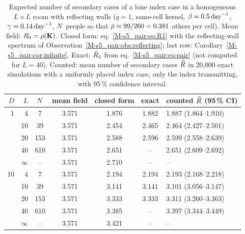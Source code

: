 \begin{table}[tbp]
\centering
\caption{Expected number of secondary cases of a lone index case in a homogeneous $L\times L$ room with
reflecting walls ($q=1$, same-cell kernel, $\beta=0.5\,\mathrm{day}^{-1}$, $\gamma=0.14\,\mathrm{day}^{-1}$, $N$ people so that
$\bar{\rho}\approx99/260=0.381$ others per cell). Mean field: $R_0=\rho(\mathbf{K})$. Closed form: eq.~\eqref{M-s5_pair:eq:R1} with the reflecting-wall
spectrum of Observation~\ref{M-s5_pair:obs:reflecting}; last row: Corollary~\ref{M-s5_pair:cor:infinite}. Exact:
$\bar{R}_1$ from eq.~\eqref{M-s5_pair:eq:pair} (not computed for $L=40$). Counted: mean number of secondary
cases $\widehat{R}$ in 20{,}000 exact simulations with a uniformly placed index case, only the index
transmitting, with 95\,\% confidence interval.}
\label{s5_pair:tab:finite}
\small
\begin{tabular}{rrccccl}
\toprule
$D$ & $L$ & $N$ & mean field & closed form & exact & counted $\widehat{R}$ (95\,\% CI)\\
\midrule
1  & 4  & 7   & 3.571 & 1.876 & 1.882 & 1.887 (1.864--1.910)\\
   & 10 & 39  & 3.571 & 2.454 & 2.465 & 2.464 (2.427--2.501)\\
   & 20 & 153 & 3.571 & 2.588 & 2.596 & 2.599 (2.558--2.639)\\
   & 40 & 610 & 3.571 & 2.651 & --    & 2.651 (2.609--2.692)\\
   & $\infty$ & -- & 3.571 & 2.710 & -- & --\\
\midrule
10 & 4  & 7   & 3.571 & 2.194 & 2.194 & 2.193 (2.168--2.218)\\
   & 10 & 39  & 3.571 & 3.141 & 3.141 & 3.101 (3.056--3.147)\\
   & 20 & 153 & 3.571 & 3.333 & 3.333 & 3.311 (3.260--3.363)\\
   & 40 & 610 & 3.571 & 3.385 & --    & 3.397 (3.344--3.449)\\
   & $\infty$ & -- & 3.571 & 3.421 & -- & --\\
\bottomrule
\end{tabular}
\end{table}

